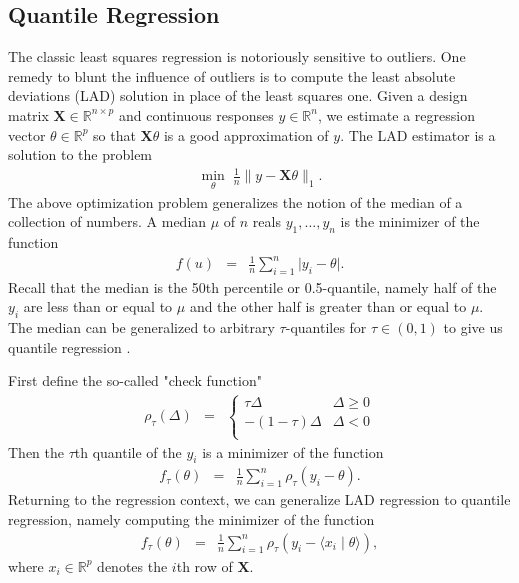 \documentclass[12pt]{article}
\begin{document}
	\subsection{Quantile Regression}
	
	The classic least squares regression is notoriously sensitive to outliers. One remedy to blunt the influence of outliers is to compute the least absolute deviations (LAD) solution in place of the least squares one. Given a design matrix $\mathbf{X} \in \mathbb{R}^{n \times p}$ and continuous responses $y \in \mathbb{R}^n$, we estimate a regression vector $\theta \in \mathbb{R}^p$ so that $\mathbf{X}\theta$ is a good approximation of $y$. The LAD estimator is a solution to the problem
	\begin{eqnarray}
		\underset{\theta}{\min}\; \frac{1}{n}\lVert y - \mathbf{X}\theta \rVert_1.
	\end{eqnarray}
	The above optimization problem generalizes the notion of the median of a collection of numbers. A median $\mu$ of $n$ reals $y_1, \ldots, y_n$ is the minimizer of the function
	\begin{eqnarray}
		f(u) & = & \frac{1}{n}\sum_{i=1}^n \lvert y_i - \theta \rvert.
	\end{eqnarray}
	Recall that the median is the 50th percentile or 0.5-quantile, namely half of the $y_i$ are less than or equal to $\mu$ and the other half is greater than or equal to $\mu$. The median can be generalized to arbitrary $\tau$-quantiles for $\tau \in (0,1)$ to give us quantile regression \citep{Koenker1978}.
	
	First define the so-called "check function"
	\begin{eqnarray}
		\rho_\tau(\Delta) & = & \begin{cases}
			\tau \Delta & \Delta \geq 0 \\
			-(1-\tau)\Delta & \Delta < 0 \\
		\end{cases}
	\end{eqnarray}
	Then the $\tau$th quantile of the $y_i$ is a minimizer of the function
	\begin{eqnarray}
		f_\tau(\theta) & = & \frac{1}{n}\sum_{i=1}^n \rho_\tau(y_i - \theta).
	\end{eqnarray}
	Returning to the regression context, we can generalize LAD regression to quantile regression, namely computing the minimizer of the function
	\begin{eqnarray}
		f_\tau(\theta) & = & \frac{1}{n}\sum_{i=1}^n \rho_\tau(y_i - \langle x_i \mid \theta \rangle),
	\end{eqnarray}
	where $x_i \in \mathbb{R}^p$ denotes the $i$th row of $\mathbf{X}$.
	
\end{document}
